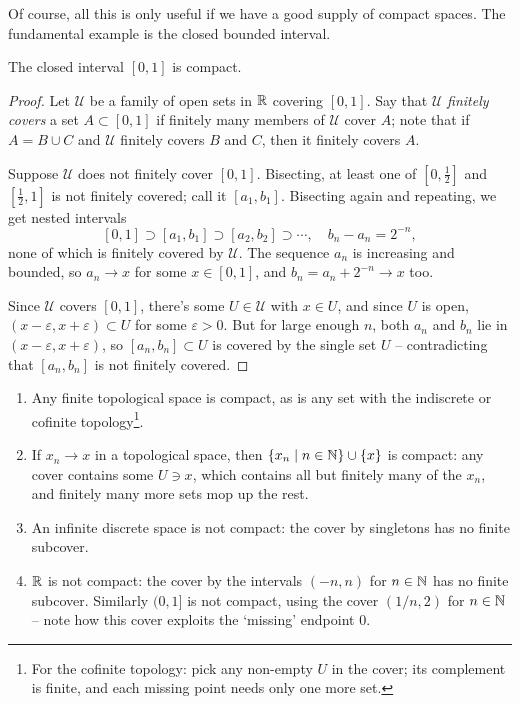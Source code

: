 \documentclass[a4paper]{scrartcl}
\begin{document}
Of course, all this is only useful if we have a good supply of compact spaces. The fundamental example is the closed bounded interval.

\begin{theorem}[{$[0, 1]$ is Compact}]\label{thm:01compact}
    The closed interval $[0, 1]$ is compact.
\end{theorem}
\begin{proof}
    Let $\mathcal{U}$ be a family of open sets in $\mathbb{R}$ covering $[0, 1]$. Say that $\mathcal{U}$ \emph{finitely covers} a set $A \subset [0, 1]$ if finitely many members of $\mathcal{U}$ cover $A$; note that if $A = B \cup C$ and $\mathcal{U}$ finitely covers $B$ and $C$, then it finitely covers $A$.

    Suppose $\mathcal{U}$ does not finitely cover $[0, 1]$. Bisecting, at least one of $[0, \frac{1}{2}]$ and $[\frac{1}{2}, 1]$ is not finitely covered; call it $[a_1, b_1]$. Bisecting again and repeating, we get nested intervals
    $$
    [0,1] \supset [a_1, b_1] \supset [a_2, b_2] \supset \cdots, \quad b_n - a_n = 2^{-n},
    $$
    none of which is finitely covered by $\mathcal{U}$. The sequence $a_n$ is increasing and bounded, so $a_n \rightarrow x$ for some $x \in [0, 1]$, and $b_n = a_n + 2^{-n} \rightarrow x$ too.

    Since $\mathcal{U}$ covers $[0, 1]$, there's some $U \in \mathcal{U}$ with $x \in U$, and since $U$ is open, $(x - \varepsilon, x + \varepsilon) \subset U$ for some $\varepsilon > 0$. But for large enough $n$, both $a_n$ and $b_n$ lie in $(x - \varepsilon, x + \varepsilon)$, so $[a_n, b_n] \subset U$ is covered by the single set $U$ -- contradicting that $[a_n, b_n]$ is not finitely covered.
\end{proof}

\begin{example}
    \begin{enumerate}[label=(\roman*)]
        \item Any finite topological space is compact, as is any set with the indiscrete or cofinite topology\footnote{For the cofinite topology: pick any non-empty $U$ in the cover; its complement is finite, and each missing point needs only one more set.}.
        \item If $x_n \rightarrow x$ in a topological space, then $\{x_n \mid n \in \mathbb{N}\} \cup \{x\}$ is compact: any cover contains some $U \ni x$, which contains all but finitely many of the $x_n$, and finitely many more sets mop up the rest.
        \item An infinite discrete space is not compact: the cover by singletons has no finite subcover.
        \item $\mathbb{R}$ is not compact: the cover by the intervals $(-n, n)$ for $n \in \mathbb{N}$ has no finite subcover. Similarly $(0, 1]$ is not compact, using the cover $(1/n, 2)$ for $n \in \mathbb{N}$ -- note how this cover exploits the `missing' endpoint $0$.
    \end{enumerate}
\end{example}
\end{document}
